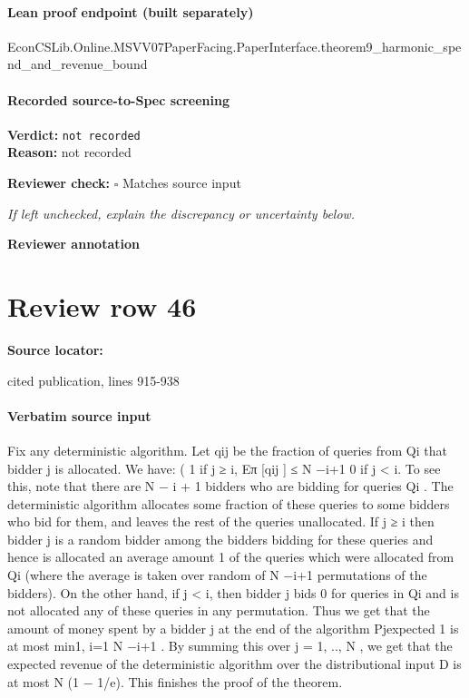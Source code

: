 \documentclass[10pt]{article}
\newcommand{\reviewerbox}{%
  \par\noindent\fbox{\parbox{0.96\linewidth}{\rule{0pt}{0.38in}}}\par
}
\newcommand{\reviewmatch}[1]{%
  \par\noindent\textbf{Reviewer check:} $\square$\; #1\par
  \noindent\emph{If left unchecked, explain the discrepancy or uncertainty below.}\par
}
\begin{document}
\paragraph{Lean proof endpoint (built separately)}\begin{ReviewVerbatim}
EconCSLib.Online.MSVV07PaperFacing.PaperInterface.theorem9_harmonic_spend_and_revenue_bound
\end{ReviewVerbatim}

\paragraph{Recorded source-to-Spec screening}
\textbf{Verdict:} \texttt{not recorded}
\\
\textbf{Reason:} not recorded
\reviewmatch{Matches source input}
\noindent\textbf{Reviewer annotation}\par
\reviewerbox
\clearpage
\hypertarget{source-claim-6addec2cb6646978}{}
\section*{Review row 46}
\textbf{Source locator:} {\footnotesize\raggedright cited publication, lines 915-\allowbreak{}938\par}
\paragraph{Verbatim source input}
\begin{ReviewVerbatim}
Fix any deterministic algorithm. Let qij be the fraction of queries from Qi that bidder j is
allocated. We have:
(
1
if j ≥ i,
Eπ [qij ] ≤ N −i+1
0
if j < i.
To see this, note that there are N − i + 1 bidders who are bidding for queries Qi . The
deterministic algorithm allocates some fraction of these queries to some bidders who bid for
them, and leaves the rest of the queries unallocated. If j ≥ i then bidder j is a random
bidder among the bidders bidding for these queries and hence is allocated an average amount
1
of the queries which were allocated from Qi (where the average is taken over random
of N −i+1
permutations of the bidders). On the other hand, if j < i, then bidder j bids 0 for queries in
Qi and is not allocated any of these queries in any permutation.
Thus we get that the
amount of money spent by a bidder j at the end of the algorithm
Pjexpected
1
is at most min{1, i=1 N −i+1 }. By summing this over j = 1, .., N , we get that the expected
revenue of the deterministic algorithm over the distributional input D is at most N (1 − 1/e).
This finishes the proof of the theorem.
\end{ReviewVerbatim}
\end{document}
